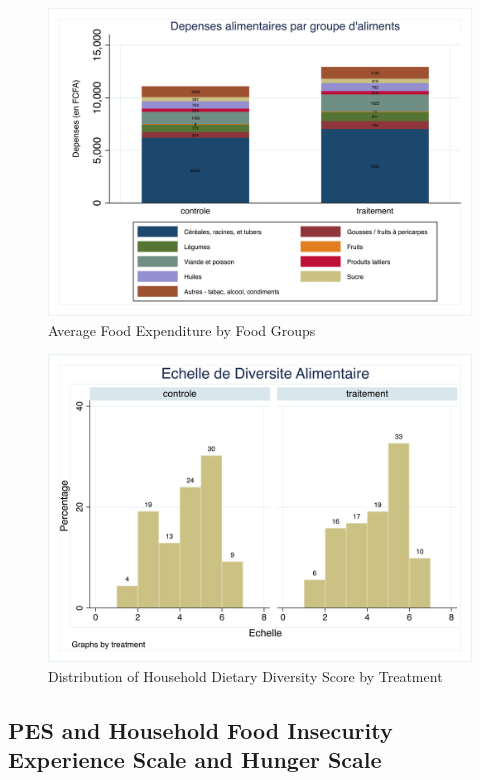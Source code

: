 \documentclass[preprint,12pt]{elsarticle}
\begin{document}
\begin{figure}[ht!]
	\footnotesize
	\centering
	\caption{Average Food Expenditure by Food Groups  \label{fig:food_exp_bygroup}}
	\includegraphics[width=0.9\linewidth]{FoodConsExp_byfoodgroup_stack.png}
\end{figure}
\FloatBarrier


\begin{figure}[ht!]
	\footnotesize
	\centering
	\caption{Distribution of Household Dietary Diversity Score by Treatment  \label{fig:HDDS}}
	\includegraphics[width=0.9\linewidth]{DiversiteAlimentaire.png}
\end{figure}
\FloatBarrier

\clearpage
\subsection{PES and Household Food Insecurity Experience Scale and Hunger Scale}
\end{document}
